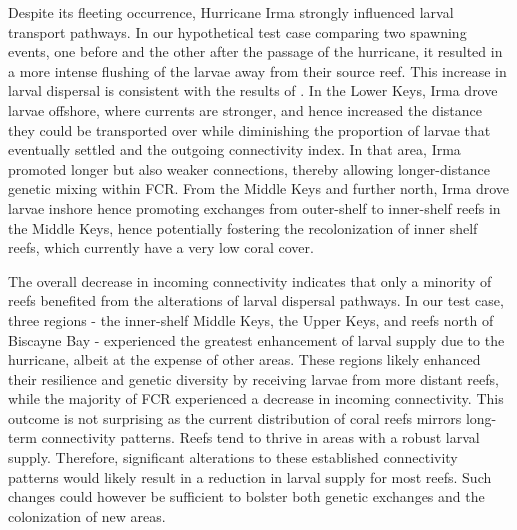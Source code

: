 \documentclass[fleqn,10pt]{wlscirep}
\begin{document}
Despite its fleeting occurrence, Hurricane Irma strongly influenced larval transport pathways. In our hypothetical test case comparing two spawning events, one before and the other after the passage of the hurricane, it resulted in a more intense flushing of the larvae away from their source reef. This increase in larval dispersal is consistent with the results of \cite{grimaldi2022hydrodynamic}. In the Lower Keys, Irma drove larvae offshore, where currents are stronger, and hence increased the distance they could be transported over while diminishing the proportion of larvae that eventually settled and the outgoing connectivity index. In that area, Irma promoted longer but also weaker connections, thereby allowing longer-distance genetic mixing within FCR. From the Middle Keys and further north, Irma drove larvae inshore hence promoting exchanges from outer-shelf to inner-shelf reefs in the Middle Keys, hence potentially fostering the recolonization of inner shelf reefs, which currently have a very low coral cover.

The overall decrease in incoming connectivity indicates that only a minority of reefs benefited from the alterations of larval dispersal pathways. In our test case, three regions - the inner-shelf Middle Keys, the Upper Keys, and reefs north of Biscayne Bay - experienced the greatest enhancement of larval supply due to the hurricane, albeit at the expense of other areas. These regions likely enhanced their resilience and genetic diversity by receiving larvae from more distant reefs, while the majority of FCR experienced a decrease in incoming connectivity. This outcome is not surprising as the current distribution of coral reefs mirrors long-term connectivity patterns. Reefs tend to thrive in areas with a robust larval supply. Therefore, significant alterations to these established connectivity patterns would likely result in a reduction in larval supply for most reefs. Such changes could however be sufficient to bolster both genetic exchanges and the colonization of new areas.
\end{document}
